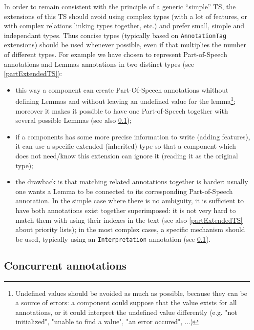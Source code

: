\documentclass{article}
\newenvironment{xitemize}{
\begin{itemize}
  \setlength{\itemsep}{.3\baselineskip}
  \setlength{\topsep}{0pt}
  \setlength{\parskip}{0pt}
  \setlength{\parsep}{0pt}
}{\end{itemize}}
\begin{document}
In order to remain consistent with the principle of a generic ``simple'' TS, the extensions of this TS should avoid using complex types (with a lot of features, or with complex relations linking types together, etc.) and prefer small, simple and independant types. Thus concise types (typically based on {\tt AnnotationTag} extensions) should be used  whenever possible, even if that multiplies the number of different types. For example we have chosen to represent Part-of-Speech annotations and Lemmas annotations in two distinct types (see \ref{partExtendedTS}):
\begin{xitemize}
\item this way a component can create Part-Of-Speech annotations whithout defining Lemmas and without leaving an undefined value for the lemma\footnote{Undefined values should be avoided as much as possible, because they can be a source of errors: a component could suppose that the value exists for all annotations, or it could interpret the undefined value differently (e.g. "not initialized", "unable to find a value", "an error occured", ...)}; moreover it makes it possible to have one Part-of-Speech together with several possible Lemmas (see also \ref{partConcurrentAnnot});
\item if a components has some more precise information to write (adding features), it can use a specific extended (inherited) type so that a component which does not need/know this extension can ignore it (reading it as the original type);
\item the drawback is that matching related annotations together is harder: usually one wants a Lemma to be connected to its corresponding Part-of-Speech annotation. In the simple case where there is no ambiguity, it is sufficient to have both annotations exist together superimposed: it is not very hard to match them with using their indexes in the text (see also \ref{partExtendedTS} about priority lists); in the most complex cases, a specific mechanism should be used, typically using an {\tt Interpretation} annotation (see \ref{partConcurrentAnnot}).
\end{xitemize}



\subsection{Concurrent annotations}
\label{partConcurrentAnnot}
\end{document}
